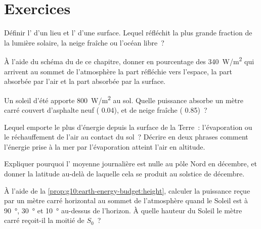 \section{Exercices}

\begin{exercise}[$\star$]\label{exo:g10:earth-energy-budget:1}
Définir l' d'un lieu et l' d'une surface. Lequel réfléchit
la plus grande fraction de la lumière solaire, la neige fraîche ou l'océan
libre~?
\end{exercise}

\begin{exercise}[$\star$]\label{exo:g10:earth-energy-budget:2}
À l'aide du schéma du  de ce chapitre, donner en
pourcentage des \qty{340}{W/m^2} qui arrivent au sommet de l'atmosphère la
part réfléchie vers l'espace, la part absorbée par l'air et la part absorbée
par la surface.
\end{exercise}

\begin{exercise}[$\star$]\label{exo:g10:earth-energy-budget:3}
Un soleil d'été apporte \qty{800}{W/m^2} au sol. Quelle puissance absorbe
un mètre carré couvert d'asphalte neuf ( 0.04), et de neige fraîche
( 0.85)~?
\end{exercise}

\begin{exercise}[$\star$]\label{exo:g10:earth-energy-budget:4}
Lequel emporte le plus d'énergie depuis la surface de la Terre~:
l'évaporation ou le réchauffement de l'air au contact du sol~? Décrire en
deux phrases comment l'énergie prise à la mer par l'évaporation atteint
l'air en altitude.
\end{exercise}

\begin{exercise}[$\star$]\label{exo:g10:earth-energy-budget:5}
Expliquer pourquoi l' moyenne journalière est nulle au pôle Nord
en décembre, et donner la latitude au-delà de laquelle cela se produit au
solstice de décembre.
\end{exercise}

\begin{exercise}[$\star\star$]\label{exo:g10:earth-energy-budget:6}
À l'aide de la \cref{prop:g10:earth-energy-budget:height}, calculer la
puissance reçue par un mètre carré horizontal au sommet de l'atmosphère
quand le Soleil est à \qty{90}{\degree}, \qty{30}{\degree} et
\qty{10}{\degree} au-dessus de l'horizon. À quelle hauteur du Soleil le
mètre carré reçoit-il la moitié de $S_0$~?
\end{exercise}

